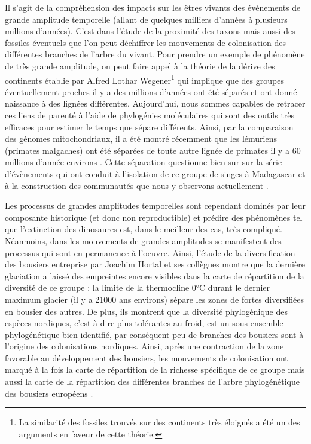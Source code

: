Il s'agit de la compréhension des impacts sur les êtres vivants des
évènements de grande amplitude temporelle (allant de quelques milliers
d'années à plusieurs millions d'années). C'est dans l'étude de la
proximité des taxons mais aussi des fossiles éventuels que l'on peut
déchiffrer les mouvements de colonisation des différentes branches de
l'arbre du vivant. Pour prendre un exemple de phénomène de très grande
amplitude, on peut faire appel à la théorie de la dérive des continents
établie par Alfred Lothar Wegener\footnote{La similarité des fossiles
  trouvés sur des continents très éloignés a été un des arguments en
  faveur de cette théorie.} qui implique que des groupes éventuellement
proches il y a des millions d'années ont été séparés et ont donné
naissance à des lignées différentes. Aujourd'hui, nous sommes capables
de retracer ces liens de parenté à l'aide de phylogénies moléculaires
qui sont des outils très efficaces pour estimer le temps que sépare
différents. Ainsi, par la comparaison des génomes mitochondriaux, il a
été montré récemment que les lémuriens (primates malgaches) ont été
séparées de toute autre lignée de primates il y a 60 millions d'année
environs \citep{Finstermeier2013}. Cette séparation questionne bien sur
sur la série d'évènements qui ont conduit à l'isolation de ce groupe de
singes à Madagascar et à la construction des communautés que nous y
observons actuellement \citep{Razafindratsima2013}.

Les processus de grandes amplitudes temporelles sont cependant dominés
par leur composante historique (et donc non reproductible) et prédire
des phénomènes tel que l'extinction des dinosaures est, dans le meilleur
des cas, très compliqué. Néanmoins, dans les mouvements de grandes
amplitudes se manifestent des processus qui sont en permanence à
l'oeuvre. Ainsi, l'étude de la diversification des bousiers entreprise
par Joachim Hortal et ses collègues \citep{Hortal2011} montre que la
dernière glaciation a laissé des empreintes encore visibles dans la
carte de répartition de la diversité de ce groupe : la limite de la
thermocline 0°C durant le dernier maximum glacier (il y a 21000 ans
environs) sépare les zones de fortes diversifiées en bousier des autres.
De plus, ils montrent que la diversité phylogénique des espèces
nordiques, c'est-à-dire plus tolérantes au froid, est un sous-ensemble
phylogénétique bien identifié, par conséquent peu de branches des
bousiers sont à l'origine des colonisations nordiques. Ainsi, après une
contraction de la zone favorable au développement des bousiers, les
mouvements de colonisation ont marqué à la fois la carte de répartition
de la richesse spécifique de ce groupe mais aussi la carte de la
répartition des différentes branches de l'arbre phylogénétique des
bousiers européens \citep{Hortal2011}.

